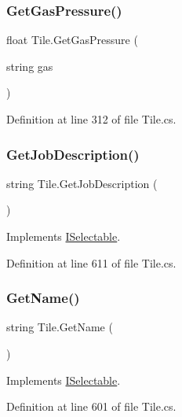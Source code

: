 \subsubsection{\texorpdfstring{Get\+Gas\+Pressure()}{GetGasPressure()}}
{\footnotesize\ttfamily float Tile.\+Get\+Gas\+Pressure (\begin{DoxyParamCaption}\item[{string}]{gas }\end{DoxyParamCaption})}



Definition at line 312 of file Tile.\+cs.

\mbox{\label{class_tile_a6f3f4232bc888cd335b3d0b2af6edda5}} 
\subsubsection{\texorpdfstring{Get\+Job\+Description()}{GetJobDescription()}}
{\footnotesize\ttfamily string Tile.\+Get\+Job\+Description (\begin{DoxyParamCaption}{ }\end{DoxyParamCaption})}



Implements \hyperlink{interface_i_selectable_a4d0f9fa51a3d70a7fbcbb39e126e4c73}{I\+Selectable}.



Definition at line 611 of file Tile.\+cs.

\mbox{\label{class_tile_a6a552b263f6505a56a4d81f9ed835e84}} 
\subsubsection{\texorpdfstring{Get\+Name()}{GetName()}}
{\footnotesize\ttfamily string Tile.\+Get\+Name (\begin{DoxyParamCaption}{ }\end{DoxyParamCaption})}



Implements \hyperlink{interface_i_selectable_af676ba50e2cd5839438d3092743a79da}{I\+Selectable}.



Definition at line 601 of file Tile.\+cs.

